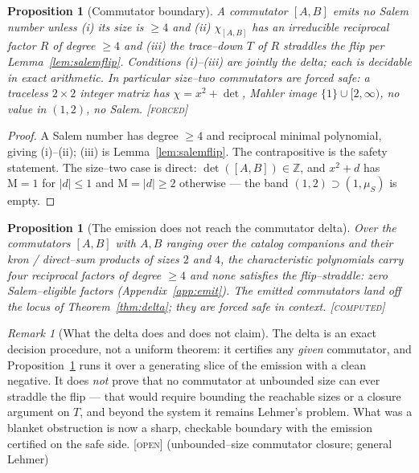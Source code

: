 \documentclass[11pt]{article}
\theoremstyle{plain}
\newtheorem{proposition}[theorem]{Proposition}
\theoremstyle{definition}
\theoremstyle{remark}
\newtheorem{remark}[theorem]{Remark}
\newcommand{\forced}{\textcolor{forcedc}{\textsc{[forced]}}}
\newcommand{\openq}{\textcolor{openc}{\textsc{[open]}}}
\newcommand{\computed}{\textcolor{forcedc}{\textsc{[computed]}}}
\newcommand{\Z}{\mathbb{Z}}
\newcommand{\Mah}{\mathrm{M}}
\newcommand{\charp}{\chi}
\newcommand{\abs}[1]{\left\lvert #1 \right\rvert}
\begin{document}
\begin{proposition}[Commutator boundary]\label{prop:comm}
A commutator $[A,B]$ emits no Salem number unless (i) its size is $\ge4$ \emph{and} (ii) $\charp_{[A,B]}$ has an irreducible reciprocal factor $R$ of degree $\ge4$ \emph{and} (iii) the trace--down $T$ of $R$ straddles the flip per Lemma~\ref{lem:salemflip}. Conditions (i)--(iii) are jointly the delta; each is decidable in exact arithmetic. In particular size--two commutators are forced safe: a traceless $2\times2$ integer matrix has $\charp=x^2+\det$, Mahler image $\{1\}\cup[2,\infty)$, no value in $(1,2)$, no Salem. \forced
\end{proposition}

\begin{proof}
A Salem number has degree $\ge4$ and reciprocal minimal polynomial, giving (i)--(ii); (iii) is Lemma~\ref{lem:salemflip}. The contrapositive is the safety statement. The size--two case is direct: $\det([A,B])\in\Z$, and $x^2+d$ has $\Mah=1$ for $\abs d\le1$ and $\Mah=\abs d\ge2$ otherwise --- the band $(1,2)\supset(1,\mu_S)$ is empty. \end{proof}

\begin{proposition}[The emission does not reach the commutator delta]\label{prop:commemit}
Over the commutators $[A,B]$ with $A,B$ ranging over the catalog companions and their kron / direct--sum products of sizes $2$ and $4$, the characteristic polynomials carry four reciprocal factors of degree $\ge4$ and \emph{none} satisfies the flip--straddle: zero Salem--eligible factors (Appendix~\ref{app:emit}). The emitted commutators land off the locus of Theorem~\ref{thm:delta}; they are forced safe in context. \computed
\end{proposition}

\begin{remark}[What the delta does and does not claim]\label{rem:deltaclaim}
The delta is an exact decision procedure, not a uniform theorem: it certifies any \emph{given} commutator, and Proposition~\ref{prop:commemit} runs it over a generating slice of the emission with a clean negative. It does \emph{not} prove that no commutator at unbounded size can ever straddle the flip --- that would require bounding the reachable sizes or a closure argument on $T$, and beyond the system it remains Lehmer's problem. What was a blanket obstruction is now a sharp, checkable boundary with the emission certified on the safe side. \openq{} (unbounded--size commutator closure; general Lehmer)
\end{remark}
\end{document}
